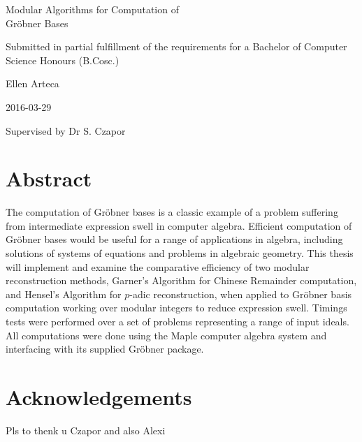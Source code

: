 \documentclass[letterpaper,12pt,titlepage,oneside,final]{book}
\begin{document}
\thispagestyle{empty}
\begin{center}
\begin{minipage}{0.75\linewidth}
    \centering
    {\LARGE Modular Algorithms for Computation of \\Gr\"obner Bases\par}
    \vspace{5cm}
    { Submitted in partial fulfillment of the requirements for a Bachelor of Computer Science Honours (B.Cosc.)\par}
    \vspace{5cm}
    {\large Ellen Arteca\par}
    {\large 2016-03-29\par}
    \vspace{2cm}
    { Supervised by Dr S. Czapor\par}
\end{minipage}
\end{center}
\clearpage

\frontmatter

\chapter*{Abstract}%
%

The computation of Gr\"obner bases is a classic example of a problem suffering from intermediate expression swell in computer algebra.  Efficient computation of Gr\"obner bases would be useful for a range of applications in algebra, including solutions of systems of equations and problems in algebraic geometry.  This thesis will implement and examine the comparative efficiency of two modular reconstruction methods, Garner's Algorithm for Chinese Remainder computation, and Hensel's Algorithm for ${p}$-adic reconstruction, when applied to Gr\"obner basis computation working over modular integers to reduce expression swell.  Timings tests were performed over a set of problems representing a range of input ideals.  All computations were done using the Maple computer algebra system and interfacing with its supplied Gr\"obner package. 


\chapter*{Acknowledgements}%
%

Pls to thenk u Czapor and also Alexi
\end{document}
